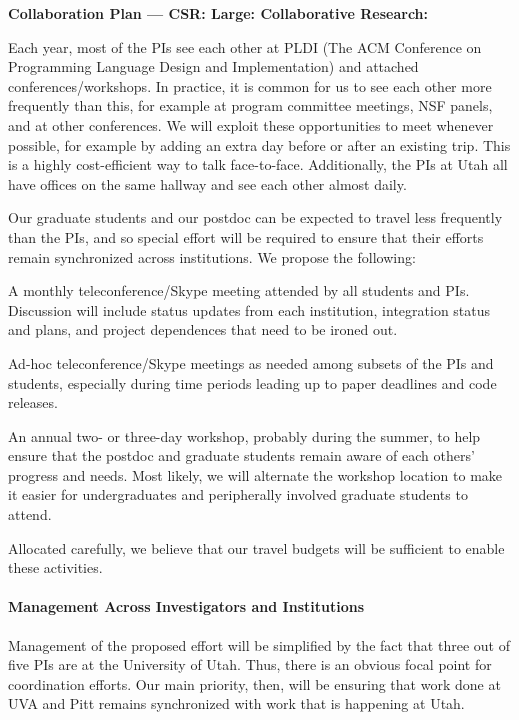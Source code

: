\begin{center}
{\Large\sf\textbf{Collaboration Plan --- 
CSR: Large: Collaborative Research:\\ \proptitle{}}}
\end{center}



%
Each year, most of the PIs see each other at PLDI (The ACM Conference
on Programming Language Design and Implementation) and attached
conferences/workshops.
%
In practice, it is common for us to see each other more frequently
than this, for example at program committee meetings, NSF panels,
and at other conferences.
%
We will exploit these opportunities to meet whenever possible, for
example by adding an extra day before or after an existing trip.
%
This is a highly cost-efficient way to talk face-to-face.
%
Additionally, the PIs at Utah all have offices on the same hallway and
see each other almost daily.


Our graduate students and our postdoc can be expected to travel less
frequently than the PIs, and so special effort will be required to
ensure that their efforts remain synchronized across institutions.
%
We propose the following:
\begin{compactenum}
\item
A monthly teleconference/Skype meeting attended by all
students and PIs.  Discussion will include status updates from each
institution, integration status and plans, and 
project dependences that need to be ironed out.
\item
Ad-hoc teleconference/Skype meetings as needed among subsets
of the PIs and students, especially during time periods leading up to
paper deadlines and code releases.
\item
An annual two- or three-day \name{} workshop, probably during
the summer, to help ensure that the postdoc and graduate students
remain aware of each others' progress and needs.
%
Most likely, we will alternate the workshop location to make it easier
for undergraduates and peripherally involved graduate students to
attend.
\end{compactenum}
%
Allocated carefully, we believe that our travel budgets will be
sufficient to enable these activities.


\paragraph{Management Across Investigators and Institutions}
%
Management of the proposed effort will be simplified by the fact that
three out of five PIs are at the University of Utah.
%
Thus, there is an obvious focal point for coordination efforts.
%
Our main priority, then, will be ensuring that work done at UVA and
Pitt remains synchronized with work that is happening at Utah.


